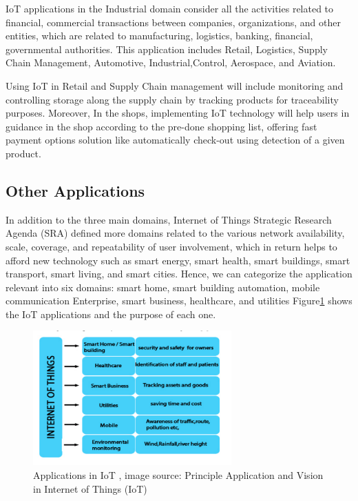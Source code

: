\documentclass[conference]{IEEEtran}
\begin{document}
IoT applications in the Industrial domain consider all the activities related to financial, commercial transactions between companies, organizations, and other entities, which are related to manufacturing, logistics, banking, financial, governmental authorities. This application includes Retail, Logistics, Supply Chain Management, Automotive, Industrial,Control, Aerospace, and Aviation. \cite{por}

Using  IoT in Retail and Supply Chain management will include monitoring and controlling storage along the supply chain by tracking products for traceability purposes. Moreover,  In the shops, implementing IoT technology will help users in guidance in the shop according to the pre-done shopping list, offering fast payment options solution  like automatically check-out using detection of a given product. \cite{por}

\subsection{Other Applications}

In addition to the three main domains, Internet of Things Strategic Research Agenda (SRA) \cite{SRA} defined more domains related to the various network availability, scale, coverage, and repeatability of user involvement, which in return helps to afford new technology such as smart energy, smart health, smart buildings, smart transport, smart living, and smart cities. Hence, we can categorize the application relevant into six domains: smart home, smart building automation, mobile communication Enterprise, smart business, healthcare, and utilities Figure\ref{Applications} shows the IoT applications and the purpose of each one. 


\begin{figure}[h!]
	\centering
	\includegraphics[width=3in]{Applications.png}
	\caption{\label{Applications}  Applications in IoT  , image source: 
		Principle Application and Vision in Internet
		of Things (IoT)\cite{App} }
\end{figure}
\end{document}
